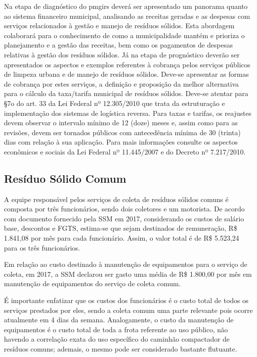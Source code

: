 	Na etapa de diagnóstico do \gls{pmgirs} deverá ser apresentado um panorama quanto ao sistema financeiro municipal, analisando as receitas geradas e as despesas com serviços relacionados à gestão e manejo de resíduos sólidos. Esta abordagem colaborará para o conhecimento de como a municipalidade mantém e prioriza o planejamento e a gestão das receitas, bem como os pagamentos de despesas relativas à gestão dos resíduos sólidos.
	Já na etapa de prognóstico deverão ser apresentados os aspectos e exemplos referentes à cobrança pelos serviços públicos de limpeza urbana e de manejo de resíduos sólidos. Deve-se apresentar as formas de cobrança por estes serviços, a definição e proposição da melhor alternativa para o cálculo da taxa/tarifa municipal de resíduos sólidos.
	Deve-se atentar para §7o do art. 33 da Lei Federal nº 12.305/2010 que trata da estruturação e implementação dos sistemas de logística reversa.
	Para taxas e tarifas, os reajustes devem observar o intervalo mínimo de 12 (doze) meses e, assim como para as revisões, devem ser tornados públicos com antecedência mínima de 30 (trinta) dias com relação à sua aplicação.
	Para mais informações consulte os aspectos econômicos e sociais da Lei Federal nº 11.445/2007 e do Decreto nº 7.217/2010.


	\subsection{Resíduo Sólido Comum}
	A equipe responsável pelos serviços de coleta de resíduos sólidos comuns é composta por três funcionários, sendo dois coletores e um motorista. De acordo com documento fornecido pela SSM em 2017, considerando os custos de salário base, descontos e FGTS, estima-se que sejam destinados de remuneração, R\$ 1.841,08 por mês para cada funcionário. Assim, o valor total é de R\$ 5.523,24 para os três funcionários.
	
	Em relação ao custo destinado à manutenção de equipamentos para o serviço de coleta, em 2017, a SSM declarou ser gasto uma média de R\$ 1.800,00 por mês em manutenção de equipamentos do serviço de coleta comum.
	
	É importante enfatizar que os custos dos funcionários é o custo total de todos os serviços prestados por eles, sendo a coleta comum uma parte relevante pois ocorre atualmente em 4 dias da semana. Analogamente, o custo da manutenção de equipamentos é o custo total de toda a frota referente ao uso público, não havendo a correlação exata do uso específico do caminhão compactador de resíduos comuns; ademais, o mesmo pode ser considerado bastante flutuante.
	
